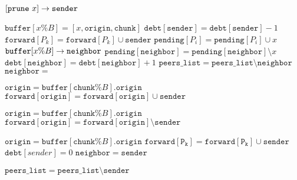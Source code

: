 \documentclass{article}
\begin{document}
\begin{algorithmic}
  \State $[\mathtt{prune}~x] \rightarrow \mathtt{sender}$
  \EndProcedure  
\end{algorithmic}

\begin{algorithmic}
  \State $\mathtt{buffer}[x \% B] = [x,\mathtt{origin},\mathtt{chunk}]$
  \State $\mathtt{debt}[\mathtt{sender}] = \mathtt{debt}[\mathtt{sender}]-1$
  \State $\mathtt{forward}[P_k] = \mathtt{forward}[P_k] \cup \mathtt{sender}$
  \EndIf
  \State $\mathtt{pending}[P_i] = \mathtt{pending}[P_i] \cup x$
  \EndFor
  \State $\mathtt{buffer}[x\% B] \rightarrow \mathtt{neighbor}$
  \State $\mathtt{pending}[\mathtt{neighbor}] = \mathtt{pending}[\mathtt{neighbor}] \setminus x$
  \State $\mathtt{debt}[\mathtt{neighbor}]=\mathtt{debt}[\mathtt{neighbor}]+1$
  \State $\mathtt{peers\_list} = \mathtt{peers\_list}\setminus \mathtt{neighbor}$
  \EndFor
  \EndIf
  \EndFor
  \State $\mathtt{neighbor} =$ 
  \EndProcedure  
\end{algorithmic}

\begin{algorithmic}

  \State $\mathtt{origin}=\mathtt{buffer}[\mathtt{chunk}\% B].\mathtt{origin}$
  \State $\mathtt{forward}[\mathtt{origin}] = \mathtt{forward}[\mathtt{origin}] \cup \mathtt{sender}$
  \EndIf

  \State $\mathtt{origin}=\mathtt{buffer}[\mathtt{chunk}\% B].\mathtt{origin}$
  \State$\mathtt{forward}[\mathtt{origin}] = \mathtt{forward}[\mathtt{origin}] \setminus \mathtt{sender}$
  \EndIf
  
  \State $\mathtt{origin}=\mathtt{buffer}[\mathtt{chunk}\% B].\mathtt{origin}$
  \State $\mathtt{forward}[\mathtt{P_k}] = \mathtt{forward}[\mathtt{P_ k}] \cup \mathtt{sender}$
  \State $\mathtt{debt}[sender] = 0$
  \State $\mathtt{neighbor} = \mathtt{sender}$
  \EndIf
  
  \State $\mathtt{peers\_list} = \mathtt{peers\_list}\setminus \mathtt{sender}$
  \EndFor
  \EndIf
  
  \EndProcedure  
\end{algorithmic}
\end{document}

